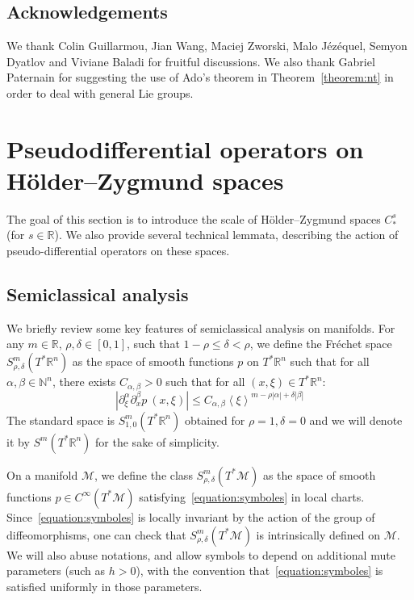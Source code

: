 \documentclass[AHL,Unicode,longabstracts,published]{cedram}
\newcommand{\R}{\mathbb{R}}
\newcommand{\N}{\mathbb{N}}
\newcommand{\M}{\mathcal{M}}
\begin{document}
\subsection*{Acknowledgements}
We thank Colin Guillarmou, Jian Wang, Maciej Zworski, Malo Jézéquel, Semyon Dyatlov and Viviane Baladi for fruitful discussions. We also thank Gabriel Paternain for suggesting the use of Ado's theorem in Theorem~\ref{theorem:nt} in order to deal with general Lie groups. 

\section{Pseudodifferential operators on H\"older--Zygmund spaces}
\label{section:pseudo}

The goal of this section is to introduce the scale of H\"older--Zygmund spaces $C^s_*$ (for $s \in \R$). We also provide several technical lemmata, describing the action of pseudo-differential operators on these spaces.

\subsection{Semiclassical analysis}
\label{ssection:analysis}

We briefly review some key features of semiclassical analysis on manifolds. For any $m \in \R$, $\rho,\delta \in [0,1]$, such that $1-\rho \leq \delta < \rho$, we define the Fréchet space $S^m_{\rho,\delta}(T^*\R^n)$ as the space of smooth functions $p$ on $T^*\R^n$ such that for all $\alpha,\beta \in \N^n$, there exists $C_{\alpha,\beta} > 0$ such that for all $(x,\xi) \in T^*\R^n$:
\begin{equation}\label{equation:symboles}
\left|\partial^\alpha_\xi \partial^\beta_x p~(x,\xi)\right| \leq C_{\alpha,\beta} \left\langle \xi \right\rangle^{m-\rho|\alpha|+\delta|\beta|}
\end{equation}
The standard space is $S^m_{1,0}(T^*\R^n)$ obtained for $\rho=1,\delta=0$ and we will denote it by $S^m(T^*\R^n)$ for the sake of simplicity.

On a manifold $\M$, we define the class $S^m_{\rho,\delta}(T^*\M)$ as the space of smooth functions $p \in C^\infty(T^*\M)$ satisfying~\eqref{equation:symboles} in local charts. Since~\eqref{equation:symboles} is locally invariant by the action of the group of diffeomorphisms, one can check that $S^m_{\rho,\delta}(T^*\M)$ is intrinsically defined on $\M$. We will also abuse notations, and allow symbols to depend on additional mute parameters (such as $h>0$), with the convention that~\eqref{equation:symboles} is satisfied uniformly in those parameters.
\end{document}
